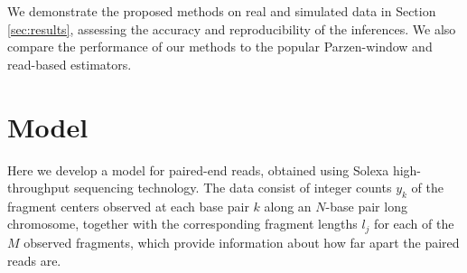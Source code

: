 We demonstrate the proposed methods on real and simulated data in Section \ref{sec:results}, assessing the accuracy and reproducibility of the inferences.
We also compare the performance of our methods to the popular Parzen-window and read-based estimators.


\section{Model}
\label{sec:model}

Here we develop a model for paired-end reads, obtained using Solexa high-throughput sequencing technology. 
%
The data consist of integer counts $y_k$ of the fragment centers observed at each base pair $k$ along an $N$-base pair long chromosome, together with the corresponding fragment lengths $l_j$ for each of the $M$ observed fragments, which provide information about how far apart the paired reads are. 


